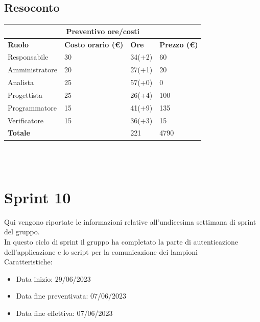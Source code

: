 \documentclass[12pt]{article}
\begin{document}
\subsection{Resoconto}
\begin{center}
    \begin{tabularx}{\textwidth}{|X|X|X|X|}
        \hline
        \multicolumn{4}{|c|}{\textbf{Preventivo ore/costi}}\\
        \hline
        \hline
        \textbf{Ruolo} & \textbf{Costo orario (\euro)} & \textbf{Ore} & \textbf{Prezzo (\euro)}\\
        \hline
        Responsabile    & 30 & 34(+2)  & 60\\
        \hline
        Amministratore  & 20 & 27(+1)  & 20\\
        \hline
        Analista        & 25 & 57(+0)  & 0\\
        \hline
        Progettista     & 25 & 26(+4)  & 100\\
        \hline
        Programmatore   & 15 & 41(+9)  & 135\\
        \hline
        Verificatore    & 15 & 36(+3)  & 15\\
        \hline
        \hline
        \textbf{Totale} &    & 221 &  4790 \\
        \hline
    \end{tabularx}\\[8pt]
    \mbox{}\\
\end{center}

\section{Sprint 10}
Qui vengono riportate le informazioni relative all'undicesima settimana di sprint del gruppo. \\
In questo ciclo di sprint il gruppo ha completato la parte di autenticazione dell'applicazione e lo script per la comunicazione dei lampioni \\


Caratteristiche:

\begin{itemize}
    \item Data inizio: 29/06/2023
    \item Data fine preventivata: 07/06/2023
    \item Data fine effettiva: 07/06/2023
\end{itemize}
\end{document}
